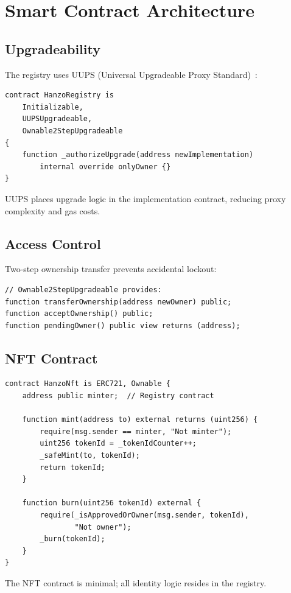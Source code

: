 \section{Smart Contract Architecture}


\subsection{Upgradeability}

The registry uses UUPS (Universal Upgradeable Proxy Standard)~\cite{eip1822}:

\begin{lstlisting}[language=Solidity]
contract HanzoRegistry is
    Initializable,
    UUPSUpgradeable,
    Ownable2StepUpgradeable
{
    function _authorizeUpgrade(address newImplementation)
        internal override onlyOwner {}
}
\end{lstlisting}

UUPS places upgrade logic in the implementation contract, reducing proxy complexity and gas costs.

\subsection{Access Control}

Two-step ownership transfer prevents accidental lockout:

\begin{lstlisting}[language=Solidity]
// Ownable2StepUpgradeable provides:
function transferOwnership(address newOwner) public;
function acceptOwnership() public;
function pendingOwner() public view returns (address);
\end{lstlisting}

\subsection{NFT Contract}

\begin{lstlisting}[language=Solidity]
contract HanzoNft is ERC721, Ownable {
    address public minter;  // Registry contract

    function mint(address to) external returns (uint256) {
        require(msg.sender == minter, "Not minter");
        uint256 tokenId = _tokenIdCounter++;
        _safeMint(to, tokenId);
        return tokenId;
    }

    function burn(uint256 tokenId) external {
        require(_isApprovedOrOwner(msg.sender, tokenId),
                "Not owner");
        _burn(tokenId);
    }
}
\end{lstlisting}

The NFT contract is minimal; all identity logic resides in the registry.

